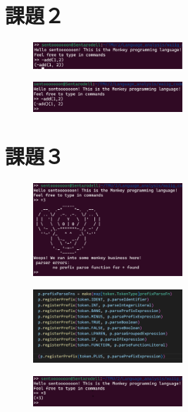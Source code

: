 \documentclass[fleqn, a4paper. 12pt]{ltjsarticle}
\begin{document}
  \section{課題２}
  \begin{figure}[htbp]
    \centering
    \includegraphics[width=0.5\textwidth]{images/2_before.png}
    \caption{}
    \label{fig:2_before}
  \end{figure}
  
  \begin{figure}[htbp]
    \centering
    \includegraphics[width=0.5\textwidth]{images/2_after.png}
    \caption{}
    \label{fig:2_after}
  \end{figure}
  
  \section{課題３}
  \begin{figure}[htbp]
    \centering
    \includegraphics[width=0.5\textwidth]{images/3_a.png}
    \caption{}
    \label{fig:3_a}
  \end{figure}
  \begin{figure}[htbp]
    \centering
    \includegraphics[width=0.5\textwidth]{images/3_b.png}
    \caption{}
    \label{fig:3_b}
  \end{figure}

  \begin{figure}[htbp]
    \centering
    \includegraphics[width=0.5\textwidth]{images/3_c.png}
    \caption{}
    \label{fig:3_c}
  \end{figure}
\end{document}
